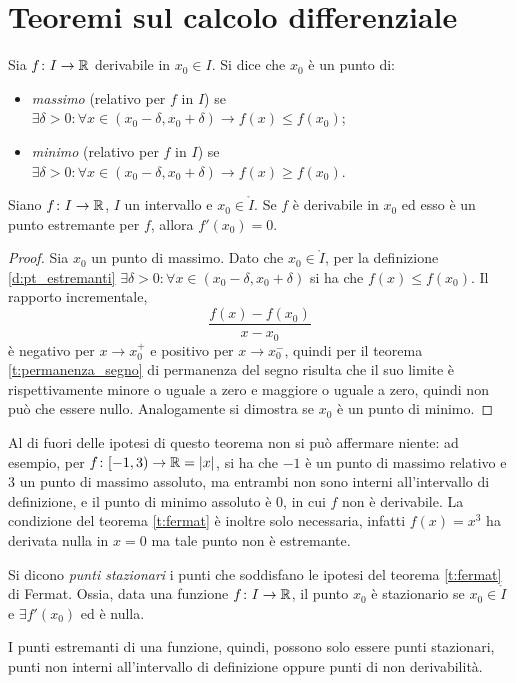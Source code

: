 \section{Teoremi sul calcolo differenziale}
\begin{definizione}
\label{d:pt_estremanti}
Sia $f\colon I\to\mathbb{R}$ derivabile in $x_0\in I$. Si dice che $x_0$ è un punto di:
\begin{itemize}
\item \emph{massimo} (relativo per $f$ in $I$) se $\exists\delta>0\colon\forall x\in(x_0-\delta,x_0+\delta)\rightarrow f(x)\leq f(x_0)$;
\item \emph{minimo} (relativo per $f$ in $I$) se $\exists\delta>0\colon\forall x\in(x_0-\delta,x_0+\delta)\rightarrow f(x)\geq f(x_0)$.
\end{itemize}
\end{definizione}
\begin{teorema}[di Fermat]
\label{t:fermat}
Siano $f\colon I\to\mathbb{R}$, $I$ un intervallo e $x_0\in\mathring{I}$. Se $f$ è derivabile in $x_0$ ed esso è un punto estremante per $f$, allora $f'(x_0)=0$.
\end{teorema}
\begin{proof}
Sia $x_0$ un punto di massimo. Dato che $x_0\in\mathring{I}$, per la definizione \ref{d:pt_estremanti} $\exists\delta>0\colon\forall x\in(x_0-\delta,x_0+\delta)$ si ha che $f(x)\leq f(x_0)$. Il rapporto incrementale,
\[
\frac{f(x)-f(x_0)}{x-x_0}
\]
è negativo per $x\to x_0^+$ e positivo per $x\to x_0^-$, quindi per il teorema \ref{t:permanenza_segno} di permanenza del segno risulta che il suo limite è rispettivamente minore o uguale a zero e maggiore o uguale a zero, quindi non può che essere nullo.
Analogamente si dimostra se $x_0$ è un punto di minimo.
\end{proof}
Al di fuori delle ipotesi di questo teorema non si può affermare niente: ad esempio, per $f\colon[-1,3)\to\mathbb{R}=\left|{x}\right|$, si ha che $-1$ è un punto di massimo relativo e 3 un punto di massimo assoluto, ma entrambi non sono interni all'intervallo di definizione, e il punto di minimo assoluto è 0, in cui $f$ non è derivabile.
La condizione del teorema \ref{t:fermat} è inoltre solo necessaria, infatti $f(x)=x^3$ ha derivata nulla in $x=0$ ma tale punto non è estremante.
\begin{definizione}
Si dicono \emph{punti stazionari} i punti che soddisfano le ipotesi del teorema \ref{t:fermat} di Fermat. Ossia, data una funzione $f\colon I\to\mathbb{R}$, il punto $x_0$ è stazionario se $x_0\in\mathring{I}$ e $\exists f'(x_0)$ ed è nulla.
\end{definizione}
I punti estremanti di una funzione, quindi, possono solo essere punti stazionari, punti non interni all'intervallo di definizione oppure punti di non derivabilità.

